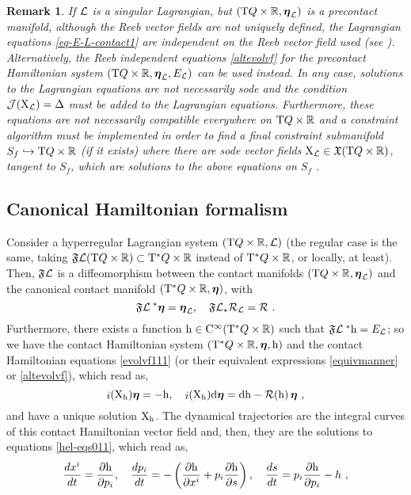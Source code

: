 \documentclass[12pt]{report}
\newtheorem{remark}[teor]{Remark}
\def\beq{\begin{equation}}
\def\eeq{\end{equation}}
\def\dst{\displaystyle}
\def\vf{\mathfrak X}
\def\Lag{{\cal L}}
\def\d{{\rm d}}
\def\Real{\mathbb{R}}
\def\bmeta{\mbox{\boldmath $\eta$}}
\def\X{{\rm X}}
\def\Tan{{\rm T}}
\def\inn{\mathop{i}\nolimits}
\def\Cinfty{{\rm C}^\infty}
\newcommand{\Reeb}{\mathcal{R}}
\begin{document}
\begin{remark}{\rm
If $\Lag$ is a singular Lagrangian, but $(\Tan Q\times\Real,\bmeta_\Lag)$ is a precontact manifold, although the Reeb vector fields
are not uniquely defined, the Lagrangian equations \eqref{eq-E-L-contact1} 
are independent on the Reeb vector field used (see \cite{DeLeon2019}).
Alternatively, the Reeb independent equations \eqref{altevolvf}
for the precontact Hamiltonian system $(\Tan Q\times\Real,\bmeta_\Lag, E_\Lag)$
can be used instead.
In any case, solutions to the Lagrangian equations
are not necessarily {\sc sode} and
the condition ${\cal J}(\X_\Lag)=\Delta$ must be added to the Lagrangian equations.
Furthermore, these equations are not necessarily compatible everywhere on $\Tan Q\times\Real$ 
and a constraint algorithm must be implemented in order to find 
a final constraint submanifold $S_f\hookrightarrow\Tan Q\times\Real$
(if it exists) where there are {\sc sode} vector fields $\X_\Lag\in\vf(\Tan Q\times\Real)$,
tangent to $S_f$, which are solutions to the above equations on $S_f$ \cite{DeLeon2019}.
}\end{remark}


\subsection{Canonical Hamiltonian formalism}


Consider a hyperregular Lagrangian system $(\Tan Q\times\Real,\Lag)$
(the regular case is the same, taking $\mathfrak{F}\Lag (\Tan Q\times\Real)\subset\Tan^*Q\times\Real$ instead of $\Tan^*Q\times\Real$, or locally, at least).
Then, $\mathfrak{F}\Lag$ is a diffeomorphism
between the contact manifolds $(\Tan Q\times\Real,\bmeta_\Lag)$ and
the canonical contact manifold
$(\Tan^*Q\times\Real,\bmeta)$,
with 
$$
\mathfrak{F}\Lag^{\;*}\bmeta=\bmeta_\Lag,\quad
\mathfrak{F}\Lag_*{\Reeb}_\Lag={\Reeb} \ .
$$
Furthermore, there exists a function ${\rm h}\in\Cinfty(\Tan^*Q\times\Real)$ 
such that $\mathfrak{F}\Lag^{\;*}{\rm h}=E_\Lag$;
so we have the contact Hamiltonian system $(\Tan^*Q\times\Real,\bmeta,{\rm h})$
and the contact Hamiltonian equations \eqref{evolvf111}
(or their equivalent expressions \eqref{equivmanner} or
\eqref{altevolvf}),
which read as,
\beq
\inn(\X_{\rm h})\bmeta=-{\rm h} ,\quad
\inn(\X_{\rm h})\d\bmeta = \d{\rm h}-\Reeb({\rm h})\,\bmeta\ ,
\label{evolvf11b}
\eeq
and have a unique solution $\X_{\rm h}$.
The dynamical trajectories are the integral curves
of this contact Hamiltonian vector field and, then, they are the solutions to equations \eqref{hel-eqs011}, which read as,
\beq
\label{hel-eqs01b}
\dst\frac{dx^i}{dt} = \frac{\partial{\rm h}}{\partial p_i},\quad
\dst\frac{dp_i}{dt} = -\left(\frac{\partial{\rm h}}{\partial x^i} + p_i\frac{\partial{\rm h}}{\partial s}\right),\quad
\dst\frac{ds}{dt} = p_i\frac{\partial{\rm h}}{\partial p_i} - h \ , 
\eeq
\end{document}
